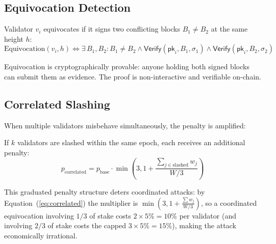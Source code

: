 \subsection{Equivocation Detection}

\begin{definition}[Equivocation]
Validator $v_i$ equivocates if it signs two conflicting blocks $B_1 \neq B_2$ at the same height $h$:
\begin{equation}
    \text{Equivocation}(v_i, h) \iff \exists\, B_1, B_2 : B_1 \neq B_2 \wedge \mathsf{Verify}(\mathsf{pk}_i, B_1, \sigma_1) \wedge \mathsf{Verify}(\mathsf{pk}_i, B_2, \sigma_2)
\end{equation}
\end{definition}

Equivocation is cryptographically provable: anyone holding both signed blocks can submit them as evidence. The proof is non-interactive and verifiable on-chain.

\subsection{Correlated Slashing}

When multiple validators misbehave simultaneously, the penalty is amplified:

\begin{definition}
If $k$ validators are slashed within the same epoch, each receives an additional penalty:
\begin{equation}\label{eq:correlated}
    p_{\text{correlated}} = p_{\text{base}} \cdot \min\left(3, 1 + \frac{\sum_{j \in \text{slashed}} w_j}{W/3}\right)
\end{equation}
\end{definition}

This graduated penalty structure deters coordinated attacks: by Equation~(\ref{eq:correlated}) the multiplier is $\min(3, 1 + \tfrac{\sum w_j}{W/3})$, so a coordinated equivocation involving $1/3$ of stake costs $2 \times 5\% = 10\%$ per validator (and involving $2/3$ of stake costs the capped $3 \times 5\% = 15\%$), making the attack economically irrational.

